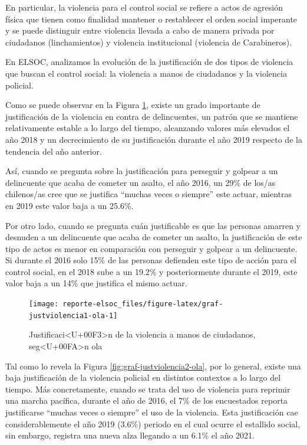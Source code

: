 \documentclass[
  12pt,
]{book}
\begin{document}
En particular, la violencia para el control social se refiere a actos de agresión física que tienen como finalidad mantener o restablecer el orden social imperante y se puede distinguir entre violencia llevada a cabo de manera privada por ciudadanos (linchamientos) y violencia institucional (violencia de Carabineros).

En ELSOC, analizamos la evolución de la justificación de dos tipos de violencia que buscan el control social: la violencia a manos de ciudadanos y la violencia policial.

Como se puede observar en la Figura \ref{fig:graf-justviolencia1-ola}, existe un grado importante de justificación de la violencia en contra de delincuentes, un patrón que se mantiene relativamente estable a lo largo del tiempo, alcanzando valores más elevados el año 2018 y un decrecimiento de su justificación durante el año 2019 respecto de la tendencia del año anterior.

Así, cuando se pregunta sobre la justificación para perseguir y golpear a un delincuente que acaba de cometer un asalto, el año 2016, un 29\% de los/as chilenos/as cree que se justifica ``muchas veces o siempre'' este actuar, mientras en 2019 este valor baja a un 25.6\%.

Por otro lado, cuando se pregunta cuán justificable es que las personas amarren y desnuden a un delincuente que acaba de cometer un asalto, la justificación de este tipo de actos es menor en comparación con perseguir y golpear a un delincuente. Si durante el 2016 solo 15\% de las personas defienden este tipo de acción para el control social, en el 2018 sube a un 19.2\% y posteriormente durante el 2019, este valor baja a un 14\% que justifica el mismo actuar.

\begin{figure}

{\centering \texttt{[image: reporte-elsoc\_files/figure-latex/graf-justviolencia1-ola-1]} 

}

\caption{Justificaci<U+00F3>n de la violencia a manos de ciudadanos, seg<U+00FA>n ola}\label{fig:graf-justviolencia1-ola}
\end{figure}

Tal como lo revela la Figura \ref{fig:graf-justviolencia2-ola}, por lo general, existe una baja justificación de la violencia policial en distintos contextos a lo largo del tiempo. Más concretamente, cuando se trata del uso de violencia para reprimir una marcha pacífica, durante el año de 2016, el 7\% de los encuestados reporta justificarse ``muchas veces o siempre'' el uso de la violencia. Esta justificación cae considerablemente el año 2019 (3.6\%) periodo en el cual ocurre el estallido social, sin embargo, registra una nueva alza llegando a un 6.1\% el año 2021.
\end{document}
